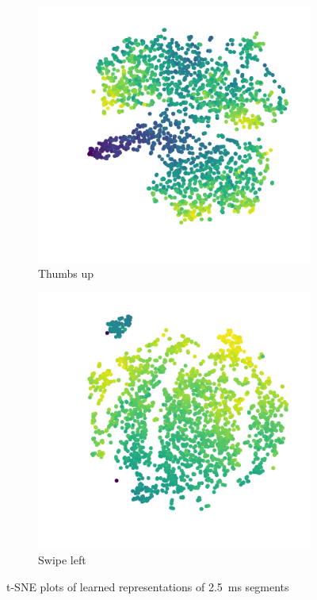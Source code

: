\begin{figure}[h]
  \centering
  \begin{subfigure}{0.49\textwidth}
    \centering
    \includegraphics{figures/methods/tsne/thumbs-up}
    \caption{Thumbs up}
  \end{subfigure}
  \begin{subfigure}{0.49\textwidth}
    \centering
    \includegraphics{figures/methods/tsne/swipe-left}
    \caption{Swipe left}
  \end{subfigure}
  \caption{t-SNE plots of learned representations of \SI{2.5}{\milli\second} segments}
  \label{fig:autoencoder}
\end{figure}

